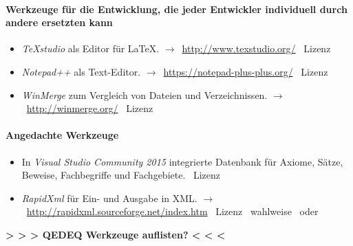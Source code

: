 \documentclass[english,ngerman,parskip=half,headsepline,footsepline]{scrreprt}
\newcounter{Enumi}
\begin{document}
	\paragraph{Werkzeuge für die Entwicklung, die jeder Entwickler individuell durch andere ersetzten kann}
	\begin{itemize}
		\setcounter{enumi}{\value{Enumi}}

		\item\label{Werkzeug:TeXstudio}\emph{\TeX studio} als Editor für \LaTeX. $\rightarrow$~\url{http://www.texstudio.org/} \textendash\ Lizenz \seename~\cite{bib:GPLii}

		\item\label{Werkzeug:Notepadpp}\emph{Notepad++} als Text-Editor. $\rightarrow$~\url{https://notepad-plus-plus.org/} \textendash\ Lizenz \seename~\cite{bib:GPLi}

		\item\label{Werkzeug:WinMerge}\emph{WinMerge} zum Vergleich von Dateien und Verzeichnissen. $\rightarrow$~\url{http://winmerge.org/} \textendash\ Lizenz \seename~\cite{bib:GPLi}

		\setcounter{Enumi}{\value{enumi}}
	\end{itemize}

	\paragraph{Angedachte Werkzeuge}
	\begin{itemize}
		\setcounter{enumi}{\value{Enumi}}

		\item\label{Werkzeug:VSC DB}In \emph{Visual Studio Community 2015} integrierte Datenbank für Axiome, Sätze, Beweise, Fachbegriffe und Fachgebiete. \textendash\ Lizenz \seename~\cite{bib:EULA}

		\item\label{Werkzeug:RapidXml}\emph{RapidXml} für Ein- und Ausgabe in XML. $\rightarrow$~\url{http://rapidxml.sourceforge.net/index.htm} \textendash\ Lizenz \seename\ wahlweise~\cite{bib:BSLi} oder~\cite{bib:MIT}

	\end{itemize}

	\par \textbf{> > > QEDEQ Werkzeuge auflisten? < < <} %
\end{document}
